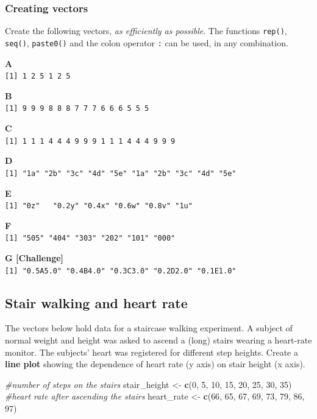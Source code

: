 \documentclass[]{book}
\newenvironment{Shaded}{\begin{snugshade}}{\end{snugshade}}
\newcommand{\CommentTok}[1]{\textcolor[rgb]{0.56,0.35,0.01}{\textit{#1}}}
\newcommand{\DecValTok}[1]{\textcolor[rgb]{0.00,0.00,0.81}{#1}}
\newcommand{\KeywordTok}[1]{\textcolor[rgb]{0.13,0.29,0.53}{\textbf{#1}}}
\newcommand{\NormalTok}[1]{#1}
\newcommand{\StringTok}[1]{\textcolor[rgb]{0.31,0.60,0.02}{#1}}
\begin{document}
\hypertarget{creating-vectors-1}{%
\subsubsection*{Creating vectors}\label{creating-vectors-1}}

Create the following vectors, \emph{as efficiently as possible}. The functions \texttt{rep()}, \texttt{seq()}, \texttt{paste0()} and the colon operator \texttt{:} can be used, in any combination.

\textbf{A}\\
\texttt{{[}1{]}\ 1\ 2\ 5\ 1\ 2\ 5}

\textbf{B}\\
\texttt{{[}1{]}\ 9\ 9\ 9\ 8\ 8\ 8\ 7\ 7\ 7\ 6\ 6\ 6\ 5\ 5\ 5}

\textbf{C}\\
\texttt{{[}1{]}\ 1\ 1\ 1\ 4\ 4\ 4\ 9\ 9\ 9\ 1\ 1\ 1\ 4\ 4\ 4\ 9\ 9\ 9}

\textbf{D}\\
\texttt{{[}1{]}\ "1a"\ "2b"\ "3c"\ "4d"\ "5e"\ "1a"\ "2b"\ "3c"\ "4d"\ "5e"}

\textbf{E}\\
\texttt{{[}1{]}\ "0z"\ \ \ "0.2y"\ "0.4x"\ "0.6w"\ "0.8v"\ "1u"}

\textbf{F}\\
\texttt{{[}1{]}\ "505"\ "404"\ "303"\ "202"\ "101"\ "000"}

\textbf{G {[}Challenge{]}}\\
\texttt{{[}1{]}\ "0.5A5.0"\ "0.4B4.0"\ "0.3C3.0"\ "0.2D2.0"\ "0.1E1.0"}

\hypertarget{stair-walking-and-heart-rate}{%
\subsection{Stair walking and heart rate}\label{stair-walking-and-heart-rate}}

The vectors below hold data for a staircase walking experiment. A subject of normal weight and height was asked to ascend a (long) stairs wearing a heart-rate monitor. The subjects' heart was registered for different step heights. Create a \textbf{line plot} showing the dependence of heart rate (y axis) on stair height (x axis).

\begin{Shaded}
\begin{Highlighting}[]
\CommentTok{#number of steps on the stairs}
\NormalTok{stair_height <-}\StringTok{ }\KeywordTok{c}\NormalTok{(}\DecValTok{0}\NormalTok{, }\DecValTok{5}\NormalTok{, }\DecValTok{10}\NormalTok{, }\DecValTok{15}\NormalTok{, }\DecValTok{20}\NormalTok{, }\DecValTok{25}\NormalTok{, }\DecValTok{30}\NormalTok{, }\DecValTok{35}\NormalTok{)}
\CommentTok{#heart rate after ascending the stairs}
\NormalTok{heart_rate <-}\StringTok{ }\KeywordTok{c}\NormalTok{(}\DecValTok{66}\NormalTok{, }\DecValTok{65}\NormalTok{, }\DecValTok{67}\NormalTok{, }\DecValTok{69}\NormalTok{, }\DecValTok{73}\NormalTok{, }\DecValTok{79}\NormalTok{, }\DecValTok{86}\NormalTok{, }\DecValTok{97}\NormalTok{)}
\end{Highlighting}
\end{Shaded}
\end{document}
